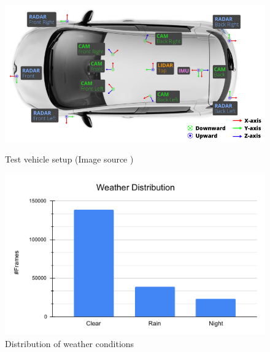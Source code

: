 \documentclass[report.tex]{subfiles}
\begin{document}
        \begin{figure}[h]
            \centering
            \begin{minipage}{0.48\textwidth}
                \centering
                \includegraphics[width=\textwidth]{images/datasets/nuscenes/test_vehicle_setup.png}
                \caption{Test vehicle setup (Image source \cite{caesar2020nuscenes})}
                \label{fig:nuscenes_test_vehicle_setup}
            \end{minipage}
            \hfill
            \begin{minipage}{0.48\textwidth}
                \centering
                \includegraphics[width=\textwidth]{images/datasets/nuscenes/distribution_of_weather_conditions.pdf}
                \caption{Distribution of weather conditions \cite{caesar2020nuscenes}}
                \label{fig:nuscenes_distribution_of_weather_conditions}
            \end{minipage}
        \end{figure}
        

\end{document}
